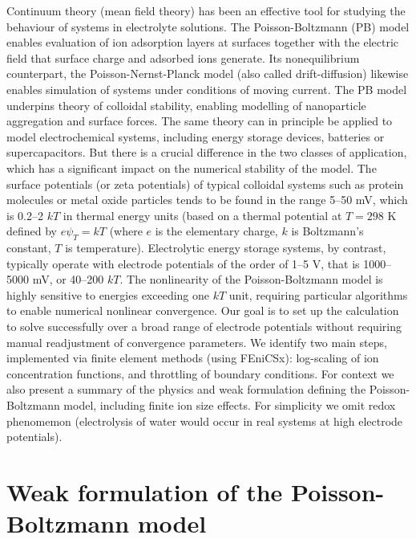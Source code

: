 Continuum theory (mean field theory) has been an effective tool for
studying the behaviour of systems in electrolyte solutions. The
Poisson-Boltzmann (PB) model \cite{Wu2022} enables evaluation of ion
adsorption layers at surfaces together with the electric field that
surface charge and adsorbed ions generate. Its nonequilibrium
counterpart, the Poisson-Nernst-Planck model
\cite{LopezGarciaHornoGrosse2018} (also called drift-diffusion)
likewise enables simulation of systems under conditions of moving
current. The PB model underpins theory of colloidal stability,
enabling modelling of nanoparticle aggregation and surface forces. The
same theory can in principle be applied to model electrochemical
systems, including energy storage devices, batteries or
supercapacitors. But there is a crucial difference in the two classes
of application, which has a significant impact on the numerical
stability of the model.  The surface potentials (or zeta potentials)
of typical colloidal systems such as protein molecules or metal oxide
particles tends to be found in the range 5--50 mV, which is 0.2--2
$kT$ in thermal energy units (based on a thermal potential at $T=298$
K defined by $e\psi_{T} = kT$ (where $e$ is the elementary charge, $k$
is Boltzmann's constant, $T$ is temperature). Electrolytic energy
storage systems, by contrast, typically operate with electrode
potentials of the order of 1--5 V, that is 1000--5000 mV, or 40--200
$kT$.  The nonlinearity of the Poisson-Boltzmann model is highly
sensitive to energies exceeding one $kT$ unit, requiring particular
algorithms to enable numerical nonlinear convergence.  Our goal is to
set up the calculation to solve successfully over a broad range of
electrode potentials without requiring manual readjustment of
convergence parameters.  We identify two main steps, implemented via
finite element methods (using FEniCSx\cite{baratta2023dolfinx}): log-scaling of
ion concentration functions, and throttling of boundary
conditions. For context we also present a summary of the physics and
weak formulation defining the Poisson-Boltzmann model, including
finite ion size effects. For simplicity we omit redox phenomemon
(electrolysis of water would occur in real systems at high electrode
potentials).

\section{Weak formulation of the Poisson-Boltzmann model}

